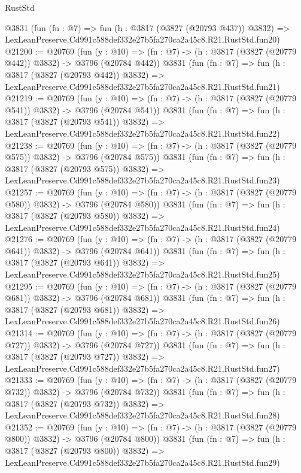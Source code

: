\begin{lexlean}{RustStd}
\begin{coremodule}
    @3831
    (fun (fn : @7) =>
    fun (h : @3817 (@3827 (@20793 @437)) @3832) =>
    LexLeanPreserve.Cd991c588def332e27b5fa270ca2a45c8.R21.RustStd.fun20)
@21200 := @20769
    (fun (y : @10) => (fn : @7) -> (h : @3817 (@3827 (@20779 @442)) @3832) -> @3796 (@20784 @442))
    @3831
    (fun (fn : @7) =>
    fun (h : @3817 (@3827 (@20793 @442)) @3832) =>
    LexLeanPreserve.Cd991c588def332e27b5fa270ca2a45c8.R21.RustStd.fun21)
@21219 := @20769
    (fun (y : @10) => (fn : @7) -> (h : @3817 (@3827 (@20779 @541)) @3832) -> @3796 (@20784 @541))
    @3831
    (fun (fn : @7) =>
    fun (h : @3817 (@3827 (@20793 @541)) @3832) =>
    LexLeanPreserve.Cd991c588def332e27b5fa270ca2a45c8.R21.RustStd.fun22)
@21238 := @20769
    (fun (y : @10) => (fn : @7) -> (h : @3817 (@3827 (@20779 @575)) @3832) -> @3796 (@20784 @575))
    @3831
    (fun (fn : @7) =>
    fun (h : @3817 (@3827 (@20793 @575)) @3832) =>
    LexLeanPreserve.Cd991c588def332e27b5fa270ca2a45c8.R21.RustStd.fun23)
@21257 := @20769
    (fun (y : @10) => (fn : @7) -> (h : @3817 (@3827 (@20779 @580)) @3832) -> @3796 (@20784 @580))
    @3831
    (fun (fn : @7) =>
    fun (h : @3817 (@3827 (@20793 @580)) @3832) =>
    LexLeanPreserve.Cd991c588def332e27b5fa270ca2a45c8.R21.RustStd.fun24)
@21276 := @20769
    (fun (y : @10) => (fn : @7) -> (h : @3817 (@3827 (@20779 @641)) @3832) -> @3796 (@20784 @641))
    @3831
    (fun (fn : @7) =>
    fun (h : @3817 (@3827 (@20793 @641)) @3832) =>
    LexLeanPreserve.Cd991c588def332e27b5fa270ca2a45c8.R21.RustStd.fun25)
@21295 := @20769
    (fun (y : @10) => (fn : @7) -> (h : @3817 (@3827 (@20779 @681)) @3832) -> @3796 (@20784 @681))
    @3831
    (fun (fn : @7) =>
    fun (h : @3817 (@3827 (@20793 @681)) @3832) =>
    LexLeanPreserve.Cd991c588def332e27b5fa270ca2a45c8.R21.RustStd.fun26)
@21314 := @20769
    (fun (y : @10) => (fn : @7) -> (h : @3817 (@3827 (@20779 @727)) @3832) -> @3796 (@20784 @727))
    @3831
    (fun (fn : @7) =>
    fun (h : @3817 (@3827 (@20793 @727)) @3832) =>
    LexLeanPreserve.Cd991c588def332e27b5fa270ca2a45c8.R21.RustStd.fun27)
@21333 := @20769
    (fun (y : @10) => (fn : @7) -> (h : @3817 (@3827 (@20779 @732)) @3832) -> @3796 (@20784 @732))
    @3831
    (fun (fn : @7) =>
    fun (h : @3817 (@3827 (@20793 @732)) @3832) =>
    LexLeanPreserve.Cd991c588def332e27b5fa270ca2a45c8.R21.RustStd.fun28)
@21352 := @20769
    (fun (y : @10) => (fn : @7) -> (h : @3817 (@3827 (@20779 @800)) @3832) -> @3796 (@20784 @800))
    @3831
    (fun (fn : @7) =>
    fun (h : @3817 (@3827 (@20793 @800)) @3832) =>
    LexLeanPreserve.Cd991c588def332e27b5fa270ca2a45c8.R21.RustStd.fun29)

\end{coremodule}
\end{lexlean}

